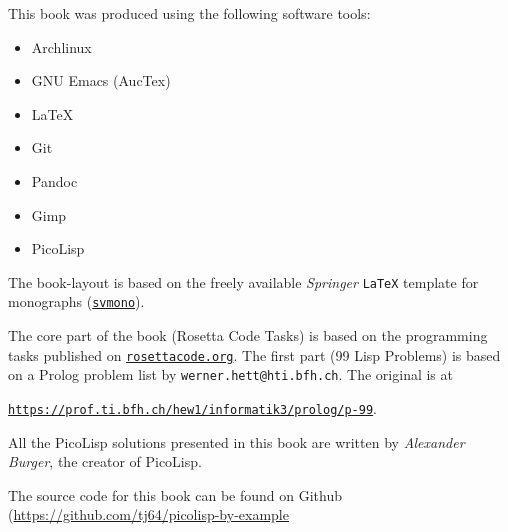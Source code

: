 %
%


This book was produced using the following software tools:

\begin{itemize}
\item Archlinux
\item GNU Emacs (AucTex)
\item LaTeX
\item Git
\item Pandoc
\item Gimp
\item PicoLisp
\end{itemize}

The book-layout is based on the freely available \emph{Springer}
\texttt{LaTeX} template for monographs
(\href{http://www.springer.com/authors/book+authors?SGWID=0-154102-12-970131-0}{\texttt{svmono}}).

The core part of the book (Rosetta Code Tasks) is based on the
programming tasks published on
\href{http://rosettacode.org/wiki/Rosetta_Code}{\texttt{rosettacode.org}}.
The first part (99 Lisp Problems) is based on a Prolog problem list by
\texttt{werner.hett@hti.bfh.ch}. The original is at

\href{https://prof.ti.bfh.ch/hew1/informatik3/prolog/p-99}{\texttt{https://prof.ti.bfh.ch/hew1/informatik3/prolog/p-99}}.
     
All the PicoLisp solutions presented in this book are written by
\emph{Alexander Burger}, the creator of PicoLisp. 

The source code for this book can be found on Github (\href{https://github.com/tj64/picolisp-by-example}{\url{https://github.com/tj64/picolisp-by-example}}





